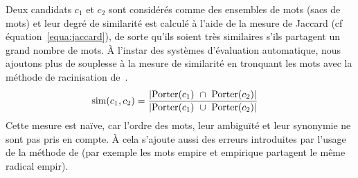         Deux candidats $c_1$ et $c_2$ sont considérés comme des ensembles de
        mots (sacs de mots) et leur degré de similarité est calculé à l'aide de
        la mesure de Jaccard (cf équation~\ref{equa:jaccard}), de sorte qu'ils
        soient très similaires s'ils partagent un grand nombre de mots.
        À l'instar des systèmes d'évaluation automatique, nous ajoutons plus de
        souplesse à la mesure de similarité en tronquant les mots avec la
        méthode de racinisation de~.
        \begin{align}
          \text{sim}(c_1, c_2) &= \frac{|\textnormal{Porter}(c_1)\ \cap\ \textnormal{Porter}(c_2)|}{|\textnormal{Porter}(c_1)\ \cup\ \textnormal{Porter}(c_2)|} \label{equa:jaccard}
        \end{align}
        Cette mesure est \og{}naïve\fg{}, car l'ordre des mots, leur ambiguïté
        et leur synonymie ne sont pas pris en compte. À cela s'ajoute aussi des
        erreurs introduites par l'usage de la méthode de
         (par exemple les mots
        \og{}empire\fg{} et \og{}empirique\fg{} partagent le même radical
        \og{}empir\fg{}).


